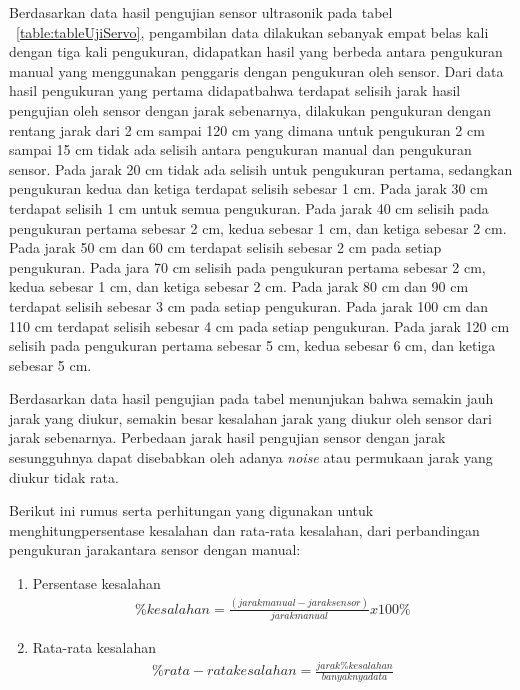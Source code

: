 Berdasarkan data hasil pengujian sensor ultrasonik pada tabel ~\ref{table:tableUjiServo}, pengambilan data dilakukan sebanyak empat belas kali dengan tiga kali pengukuran, didapatkan hasil yang berbeda antara pengukuran manual yang menggunakan penggaris dengan pengukuran oleh sensor. Dari data hasil pengukuran yang pertama didapatbahwa terdapat selisih jarak hasil pengujian oleh sensor dengan jarak sebenarnya, dilakukan pengukuran dengan rentang jarak dari 2 cm sampai 120 cm yang dimana untuk pengukuran 2 cm sampai 15 cm tidak ada selisih antara pengukuran manual dan pengukuran sensor. Pada jarak 20 cm tidak ada selisih untuk pengukuran pertama, sedangkan pengukuran kedua dan ketiga terdapat selisih sebesar 1 cm. Pada jarak 30 cm terdapat selisih 1 cm untuk semua pengukuran. Pada jarak 40 cm selisih pada pengukuran pertama sebesar 2 cm, kedua sebesar 1 cm, dan ketiga sebesar 2 cm. Pada jarak 50 cm dan 60 cm terdapat selisih sebesar 2 cm pada setiap pengukuran. Pada jara 70 cm selisih pada pengukuran pertama sebesar 2 cm, kedua sebesar 1 cm, dan ketiga sebesar 2 cm. Pada jarak 80 cm dan 90 cm terdapat selisih sebesar 3 cm pada setiap pengukuran. Pada jarak 100 cm dan 110 cm terdapat selisih sebesar 4 cm pada setiap pengukuran. Pada jarak 120 cm selisih pada pengukuran pertama sebesar 5 cm, kedua sebesar 6 cm, dan ketiga sebesar 5 cm.

Berdasarkan data hasil pengujian pada tabel menunjukan bahwa semakin jauh jarak yang diukur, semakin besar kesalahan jarak yang diukur oleh sensor dari jarak sebenarnya. Perbedaan jarak hasil pengujian sensor dengan jarak sesungguhnya dapat disebabkan oleh adanya \textit{noise} atau permukaan jarak yang diukur tidak rata.

Berikut ini rumus serta perhitungan yang digunakan untuk menghitungpersentase kesalahan dan rata-rata kesalahan, dari perbandingan pengukuran jarakantara sensor dengan manual:

\begin{enumerate}[topsep=0pt,itemsep=0pt,partopsep=0pt, parsep=0pt]
    \item Persentase kesalahan
    \begin{equation}
        \label{eq:persentase-kesalahan}
        \begin{split}
        \%kesalahan = \frac{(jarak manual - jarak sensor)}{jarak manual} x 100\%
        \end{split}
    \end{equation}

    \item Rata-rata kesalahan
    \begin{equation}
        \label{eq:persentase-kesalahan}
        \begin{split}
        \%rata-rata kesalahan = \frac{jarak \% kesalahan}{banyaknya data} 
        \end{split}
    \end{equation}
\end{enumerate}


